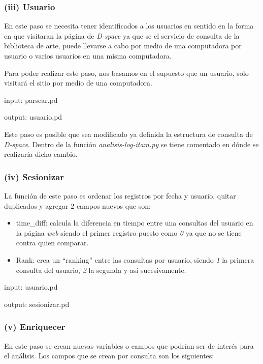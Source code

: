 \documentclass[]{article}
\begin{document}
\subsubsection{(iii) Usuario}\label{iii-usuario}

En este paso se necesita tener identificados a los usuarios en sentido
en la forma en que visitaran la página de \emph{D-space} ya que se el
servicio de consulta de la biblioteca de arte, puede llevarse a cabo por
medio de una computadora por usuario o varios usuarios en una misma
computadora.

Para poder realizar este paso, nos basamos en el supuesto que un
usuario, solo visitará el sitio por medio de una computadora.

input: parsear.pd

output: usuario.pd

Este paso es posible que sea modificado ya definida la estructura de
consulta de \emph{D-space}. Dentro de la función
\emph{analisis-log-itam.py} se tiene comentado en dónde se realizaría
dicho cambio.

\subsubsection{(iv) Sesionizar}\label{iv-sesionizar}

La función de este paso es ordenar los registros por fecha y usuario,
quitar duplicados y agregar 2 campos nuevos que son:

\begin{itemize}
\item
  time\_diff: calcula la diferencia en tiempo entre una consultas del
  usuario en la página \emph{web} siendo el primer registro puesto como
  \emph{0} ya que no se tiene contra quien comparar.
\item
  Rank: crea un ``ranking'' entre las consultas por usuario, siendo
  \emph{1} la primera consulta del usuario, \emph{2} la segunda y así
  sucesivamente.
\end{itemize}

input: usuario.pd

output: sesionizar.pd

\subsubsection{(v) Enriquecer}\label{v-enriquecer}

En este paso se crean nuevas variables o campos que podrían ser de
interés para el análisis. Los campos que se crean por consulta son los
siguientes:
\end{document}
